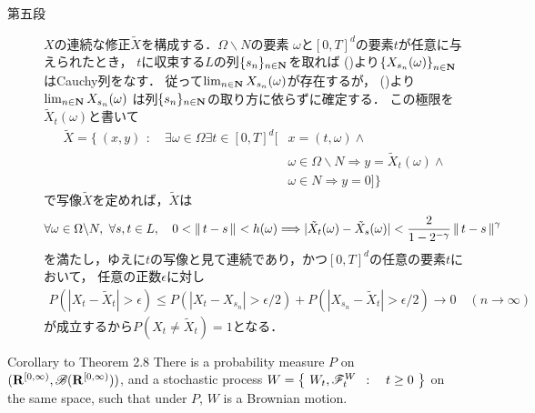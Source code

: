 \begin{prf}
\begin{description}
			\item[第五段]
				$X$の連続な修正$\tilde{X}$を構成する．$\Omega \backslash N$の要素
				$\omega$と$[0,T]^d$の要素$t$が任意に与えられたとき，
				$t$に収束する$L$の列$\{s_n\}_{n\in\mathbf{N}}$を取れば
				()より$\left\{X_{s_n}(\omega)\right\}_{n\in\mathbf{N}}$はCauchy列をなす．
				従って$\lim_{n \in \mathbf{N}}X_{s_n}(\omega)$が存在するが，
				()より$\lim_{n \in \mathbf{N}}X_{s_n}(\omega)$
				は列$\{s_n\}_{n\in\mathbf{N}}$の取り方に依らずに確定する．
				この極限を$\tilde{X}_t(\omega)$と書いて
				\begin{align}
					\tilde{X} = \Biggl\{\ (x,y)\ \, : \quad \exists \omega \in \Omega \exists t \in [0,T]^d [&x=(t,\omega) \wedge \\
					&\omega \in \Omega \backslash N \Longrightarrow y = \tilde{X}_t(\omega) \wedge \\
					&\omega \in N \Longrightarrow y=0] \Biggr\}
				\end{align}
				で写像$\tilde{X}$を定めれば，$\tilde{X}$は
				\begin{align}
					\forall \omega \in \Omega \backslash N,\
					\forall s,t \in L,\quad
					0 < \left\|\, t-s\, \right\|_{} < h(\omega)
					\Longrightarrow |\tilde{X}_t(\omega)-\tilde{X}_s(\omega)| < \frac{2}{1-2^{-\gamma}}
					\left\|\, t-s\, \right\|_{}^\gamma
				\end{align}
				を満たし，ゆえに$t$の写像と見て連続であり，かつ$[0,T]^d$の任意の要素$t$において，
				任意の正数$\epsilon$に対し
				\begin{align}
					P\left(\left|X_t - \tilde{X}_t\right| > \epsilon\right)
					\leq P\left(\left|X_t - X_{s_n}\right| > \epsilon/2\right) 
						+ P\left(\left|X_{s_n} - \tilde{X}_t\right| > \epsilon/2\right)
					\longrightarrow 0 \quad (n \longrightarrow \infty)
				\end{align}
				が成立するから$P(X_t \neq \tilde{X}_t) = 1$となる．
				\QED
		\end{description}
	\end{prf}
	
	\begin{itembox}[l]{Corollary to Theorem 2.8}
		There is a probability measure $P$ on $(\mathbf{R}^{[0,\infty)},\mathscr{B}(\mathbf{R}^{[0,\infty)}))$,
		and a stochastic process $W = \left\{\ W_t,\mathscr{F}_t^W\ \, : \quad t \geq 0\ \right\}$ on the same space,
		such that under $P$, $W$ is a Brownian motion.
	\end{itembox}
	
